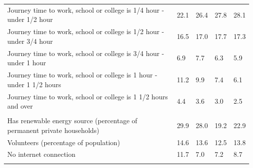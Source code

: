 \documentclass{article}
\begin{document}
\begin{table}[h]
\begin{tabular}{KTTTT}
Journey time to work, school or college is 1/4 hour - under 1/2 hour & 22.1& 26.4& 27.8& 28.1\\
Journey time to work, school or college is 1/2 hour - under 3/4 hour & 16.5& 17.0& 17.7& 17.3\\
Journey time to work, school or college is 3/4 hour - under 1 hour & 6.9& 7.7& 6.3& 5.9\\
Journey time to work, school or college is 1 hour - under 1 1/2 hours & 11.2&  9.9&  7.4&  6.1\\
Journey time to work, school or college is 1 1/2 hours and over & 4.4& 3.6& 3.0& 2.5\\
\hline
    \\ 
    \hline
Has renewable energy source (percentage of permanent private households) & 29.9& 28.0& 19.2& 22.9\\
    \hline
Volunteers (percentage of population) & 14.6& 13.6& 12.5& 13.8\\
    \hline
No internet connection& 11.7&  7.0&  7.2&  8.7\\
\hline
\end{tabular}
\end{table}
\end{document}
